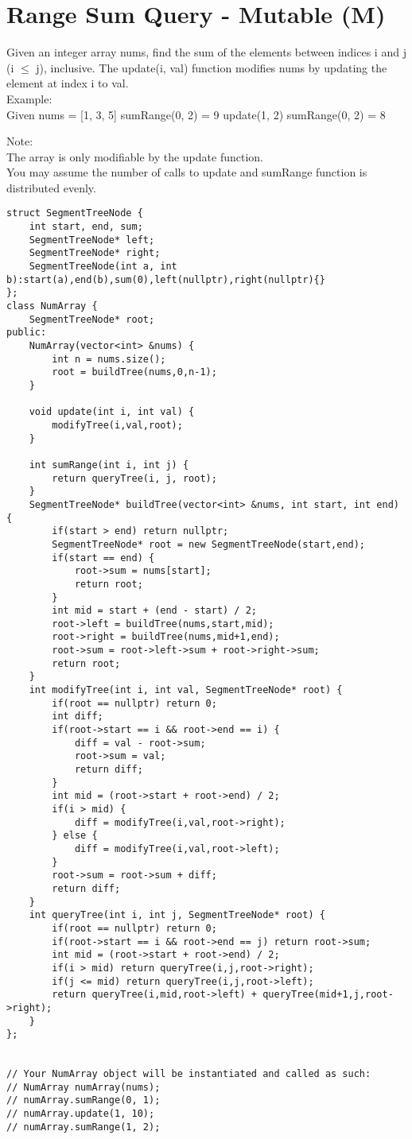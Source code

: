 \section{Range Sum Query - Mutable (M)}
Given an integer array nums, find the sum of the elements between indices i and j (i $\leq$ j), inclusive. The update(i, val) function modifies nums by updating the element at index i to val. \\

Example: \\
Given nums = [1, 3, 5]
sumRange(0, 2) = 9
update(1, 2)
sumRange(0, 2) = 8

Note:\\
    The array is only modifiable by the update function.\\
    You may assume the number of calls to update and sumRange function is distributed evenly.\\

\begin{lstlisting}
struct SegmentTreeNode {
    int start, end, sum;
    SegmentTreeNode* left;
    SegmentTreeNode* right;
    SegmentTreeNode(int a, int b):start(a),end(b),sum(0),left(nullptr),right(nullptr){}
};
class NumArray {
    SegmentTreeNode* root;
public:
    NumArray(vector<int> &nums) {
        int n = nums.size();
        root = buildTree(nums,0,n-1);
    }
   
    void update(int i, int val) {
        modifyTree(i,val,root);
    }

    int sumRange(int i, int j) {
        return queryTree(i, j, root);
    }
    SegmentTreeNode* buildTree(vector<int> &nums, int start, int end) {
        if(start > end) return nullptr;
        SegmentTreeNode* root = new SegmentTreeNode(start,end);
        if(start == end) {
            root->sum = nums[start];
            return root;
        }
        int mid = start + (end - start) / 2;
        root->left = buildTree(nums,start,mid);
        root->right = buildTree(nums,mid+1,end);
        root->sum = root->left->sum + root->right->sum;
        return root;
    }
    int modifyTree(int i, int val, SegmentTreeNode* root) {
        if(root == nullptr) return 0;
        int diff;
        if(root->start == i && root->end == i) {
            diff = val - root->sum;
            root->sum = val;
            return diff;
        }
        int mid = (root->start + root->end) / 2;
        if(i > mid) {
            diff = modifyTree(i,val,root->right);
        } else {
            diff = modifyTree(i,val,root->left);
        }
        root->sum = root->sum + diff;
        return diff;
    }
    int queryTree(int i, int j, SegmentTreeNode* root) {
        if(root == nullptr) return 0;
        if(root->start == i && root->end == j) return root->sum;
        int mid = (root->start + root->end) / 2;
        if(i > mid) return queryTree(i,j,root->right);
        if(j <= mid) return queryTree(i,j,root->left);
        return queryTree(i,mid,root->left) + queryTree(mid+1,j,root->right);
    }
};


// Your NumArray object will be instantiated and called as such:
// NumArray numArray(nums);
// numArray.sumRange(0, 1);
// numArray.update(1, 10);
// numArray.sumRange(1, 2);
\end{lstlisting}


